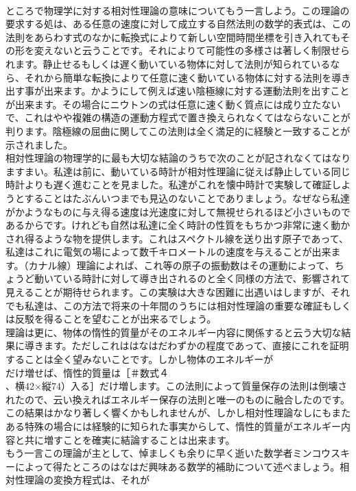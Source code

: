 \documentclass[8pt]{extreport}
\begin{document}
\begin{CJK}{UTF8}{min}
\\	ところで物理学に対する相対性理論の意味についてもう一言しよう。この理論の要求する処は、ある任意の速度に対して成立する自然法則の数学的表式は、この法則をあらわす式のなかに転換式によりて新しい空間時間坐標を引き入れてもその形を変えないと云うことです。それによりて可能性の多様さは著しく制限せられます。静止せるもしくは遅く動いている物体に対して法則が知られているなら、それから簡単な転換によりて任意に速く動いている物体に対する法則を導き出す事が出来ます。かようにして例えば速い陰極線に対する運動法則を出すことが出来ます。その場合にニウトンの式は任意に速く動く質点には成り立たないで、これはやや複雑の構造の運動方程式で置き換えられなくてはならないことが判ります。陰極線の屈曲に関してこの法則は全く満足的に経験と一致することが示されました。
\\	相対性理論の物理学的に最も大切な結論のうちで次のことが記されなくてはなりますまい。私達は前に、動いている時計が相対性理論に従えば静止している同じ時計よりも遅く進むことを見ました。私達がこれを懐中時計で実験して確証しようとすることはたぶんいつまでも見込のないことでありましょう。なぜなら私達がかようなものに与え得る速度は光速度に対して無視せられるほど小さいものであるからです。けれども自然は私達に全く時計の性質をもちかつ非常に速く動かされ得るような物を提供します。これはスペクトル線を送り出す原子であって、私達はこれに電気の場によって数千キロメートルの速度を与えることが出来ます。（カナル線）理論によれば、これ等の原子の振動数はその運動によって、ちょうど動いている時計に対して導き出されるのと全く同様の方法で、影響されて見えることが期待せられます。この実験は大きな困難に出遇いはしますが、それでも私達は、この方法で将来の十年間のうちには相対性理論の重要な確証もしくは反駁を得ることを望むことが出来るでしょう。
\\	理論は更に、物体の惰性的質量がそのエネルギー内容に関係すると云う大切な結果に導きます。ただしこれははなはだわずかの程度であって、直接にこれを証明することは全く望みないことです。しかし物体のエネルギーが 
\\	だけ増せば、惰性的質量は［＃数式４
\\	、横42×縦74）入る］だけ増します。この法則によって質量保存の法則は倒壊されたので、云い換えればエネルギー保存の法則と唯一のものに融合したのです。この結果はかなり著しく響くかもしれませんが、しかし相対性理論なしにもまたある特殊の場合には経験的に知られた事実からして、惰性的質量がエネルギー内容と共に増すことを確実に結論することは出来ます。
\\	もう一言この理論が主として、悼ましくも余りに早く逝いた数学者ミンコウスキーによって得たところのはなはだ興味ある数学的補助について述べましょう。相対性理論の変換方程式は、それが

\end{CJK}
\end{document}
